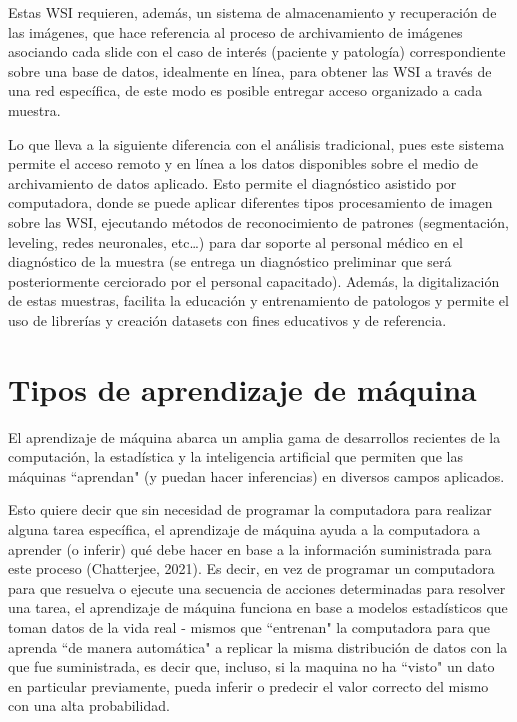\documentclass[12pt,letterpaper,final, openany]{scrbook}
\begin{document}
Estas WSI requieren, además, un sistema de almacenamiento y recuperación de las imágenes, que hace referencia al proceso de archivamiento de imágenes asociando cada slide con el caso de interés (paciente y patología) correspondiente sobre una base de datos, idealmente en línea, para obtener las WSI a través de una red específica, de este modo es posible entregar acceso organizado a cada muestra. 

Lo que lleva a la siguiente diferencia con el análisis tradicional, pues este sistema permite el acceso remoto y en línea a los datos disponibles sobre el medio de archivamiento de datos aplicado. Esto permite el diagnóstico asistido por computadora, donde se puede aplicar diferentes tipos procesamiento de imagen sobre las WSI, ejecutando métodos de reconocimiento de patrones (segmentación, leveling, redes neuronales, etc…) para dar soporte al personal médico en el diagnóstico de la muestra (se entrega un diagnóstico preliminar que será posteriormente cerciorado por el personal capacitado). Además, la digitalización de estas muestras, facilita la educación y entrenamiento de patologos y permite el uso de librerías y creación datasets con fines educativos y de referencia.

\section{Tipos de aprendizaje de máquina}

El aprendizaje de máquina abarca un amplia gama de desarrollos recientes de la computación, la estadística y la inteligencia artificial que permiten que las máquinas ``aprendan" (y puedan hacer inferencias) en diversos campos aplicados.

Esto quiere decir que sin necesidad de programar la computadora para realizar alguna tarea específica, el aprendizaje de máquina ayuda a la computadora a aprender (o inferir) qué debe hacer en base a la información suministrada para este proceso (Chatterjee, 2021). Es decir, en vez de programar un computadora para que resuelva o ejecute una secuencia de acciones determinadas para resolver una tarea, el aprendizaje de máquina funciona en base a modelos estadísticos que toman datos de la vida real - mismos que ``entrenan" la computadora para que aprenda ``de manera automática" a replicar la misma distribución de datos con la que fue suministrada, es decir que, incluso, si la maquina no ha ``visto" un dato en particular previamente, pueda inferir  o predecir el valor correcto del mismo con una alta probabilidad.
\end{document}
